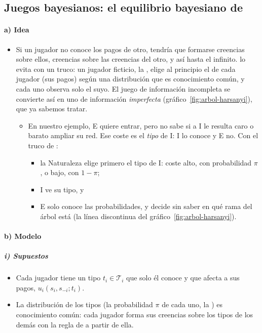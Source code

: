 \documentclass[11pt]{article}
\begin{document}
\subsection{Juegos bayesianos: el equilibrio bayesiano de }\label{sec:juegos-bayesianos}

\paragraph{a) Idea}

\begin{itemize}
\item Si un jugador no conoce los pagos de otro, tendría que formarse creencias sobre ellos, creencias sobre las creencias del otro, y así hasta el infinito. \textcite{Harsanyi1967Games} lo evita con un truco: un jugador ficticio, la , elige al principio el  de cada jugador (sus pagos) según una distribución que es conocimiento común, y cada uno observa solo el suyo. El juego de información incompleta se convierte así en uno de información \emph{imperfecta} (gráfico~\ref{fig:arbol-harsanyi}), que ya sabemos tratar.
  \begin{itemize}
  \item En nuestro ejemplo, E quiere entrar, pero no sabe si a \textup{I} le resulta caro o barato ampliar su red. Ese coste es el \emph{tipo} de \textup{I}: \textup{I} lo conoce y E no. Con el truco de :
    \begin{itemize}
    \item la Naturaleza elige primero el tipo de \textup{I}: coste alto, con probabilidad $\pi$, o bajo, con $1-\pi$;
    \item \textup{I} ve su tipo, y
    \item E solo conoce las probabilidades, y decide sin saber en qué rama del árbol está (la línea discontinua del gráfico~\ref{fig:arbol-harsanyi}).
    \end{itemize}
  \end{itemize}
\end{itemize}

\paragraph{b) Modelo}

\subparagraph{i) Supuestos}

\begin{itemize}
\item Cada jugador tiene un tipo $t_i\in\mathcal{T}_i$ que solo él conoce y que afecta a sus pagos, $u_i(s_i,s_{-i};t_i)$.
\item La distribución de los tipos (la probabilidad $\pi$ de cada uno, la ) es conocimiento común: cada jugador forma sus creencias sobre los tipos de los demás con la regla de  a partir de ella.
\end{itemize}
\end{document}
